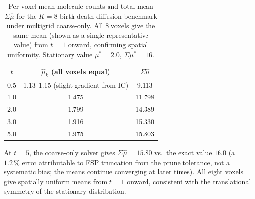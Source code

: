 \documentclass[review,onefignum,onetabnum]{siamart171218}
\begin{document}
\begin{table}[ht]
\centering
\caption{Per-voxel mean molecule counts and total mean $\Sigma\hat\mu$
  for the $K=8$ birth-death-diffusion benchmark under multigrid
  coarse-only.  All 8 voxels give the same mean (shown as a single
  representative value) from $t = 1$ onward, confirming spatial
  uniformity.  Stationary value $\mu^* = 2.0$, $\Sigma\mu^* = 16$.}
\label{tab:k8-means}
\begin{tabular}{c|c|c}
\hline
$t$ & $\hat\mu_k$ (all voxels equal) & $\Sigma\hat\mu$ \\
\hline
0.5 & 1.13--1.15 (slight gradient from IC) & 9.113 \\
1.0 & 1.475 & 11.798 \\
2.0 & 1.799 & 14.389 \\
3.0 & 1.916 & 15.330 \\
5.0 & 1.975 & 15.803 \\
\hline
\end{tabular}
\end{table}

At $t = 5$, the coarse-only solver gives $\Sigma\hat\mu = 15.80$
vs.\ the exact value $16.0$ (a $1.2\,\%$ error attributable to
FSP truncation from the prune tolerance, not a systematic bias;
the means continue converging at later times).  All eight voxels
give spatially uniform means from $t = 1$ onward, consistent with
the translational symmetry of the stationary distribution.
\end{document}
